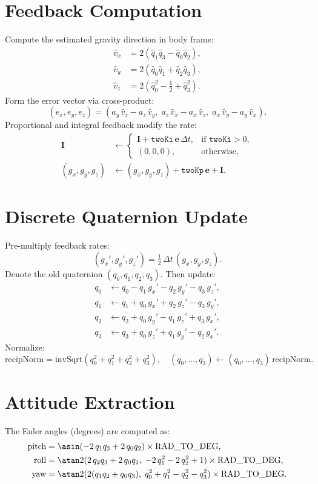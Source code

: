 \documentclass[12pt]{article}
\begin{document}
\section{Feedback Computation}
Compute the estimated gravity direction in body frame:
\[
\begin{aligned}
\hat v_x &= 2(\hat q_1\hat q_3 - \hat q_0\hat q_2),\\
\hat v_y &= 2(\hat q_0\hat q_1 + \hat q_2\hat q_3),\\
\hat v_z &= 2(\hat q_0^2 - \tfrac12 + \hat q_3^2).
\end{aligned}
\]
Form the error vector via cross-product:
\[
(e_x,e_y,e_z)
= (a_y\,\hat v_z - a_z\,\hat v_y,\;
  a_z\,\hat v_x - a_x\,\hat v_z,\;
  a_x\,\hat v_y - a_y\,\hat v_x).
\]
Proportional and integral feedback modify the rate:
\[
\begin{aligned}
\mathbf I &\leftarrow
\begin{cases}
\mathbf I + \texttt{twoKi}\, \mathbf e\,\Delta t, &\text{if }\texttt{twoKi}>0,\\
(0,0,0), &\text{otherwise},
\end{cases}\\
(g_x,g_y,g_z) &\leftarrow (g_x,g_y,g_z)
+ \texttt{twoKp}\,\mathbf e
+ \mathbf I.
\end{aligned}
\]

\section{Discrete Quaternion Update}
Pre-multiply feedback rates:
\[
(g_x',g_y',g_z') = \tfrac12\,\Delta t\,(g_x,g_y,g_z).
\]
Denote the old quaternion $(q_0,q_1,q_2,q_3)$.  Then update:
\[
\begin{aligned}
q_0 &\leftarrow q_0 - q_1\,g_x' - q_2\,g_y' - q_3\,g_z',\\
q_1 &\leftarrow q_1 + q_0\,g_x' + q_2\,g_z' - q_3\,g_y',\\
q_2 &\leftarrow q_2 + q_0\,g_y' - q_1\,g_z' + q_3\,g_x',\\
q_3 &\leftarrow q_3 + q_0\,g_z' + q_1\,g_y' - q_2\,g_x'.
\end{aligned}
\]
Normalize:
\[
\text{recipNorm} = \mathrm{invSqrt}(q_0^2+q_1^2+q_2^2+q_3^2),\quad
(q_0,\dots,q_3)\leftarrow(q_0,\dots,q_3)\,\text{recipNorm}.
\]

\section{Attitude Extraction}
The Euler angles (degrees) are computed as:
\[
\begin{aligned}
\text{pitch} &=
\asin(-2\,q_1q_3 + 2\,q_0q_2)\times\mathrm{RAD\_TO\_DEG},\\
\text{roll}  &=
\atan2(2\,q_2q_3 + 2\,q_0q_1,\;
       -2\,q_1^2 -2\,q_2^2 +1)\times\mathrm{RAD\_TO\_DEG},\\
\text{yaw}   &=
\atan2(2(q_1q_2+q_0q_3),\;
       q_0^2+q_1^2 - q_2^2 - q_3^2)\times\mathrm{RAD\_TO\_DEG}.
\end{aligned}
\]
\end{document}
